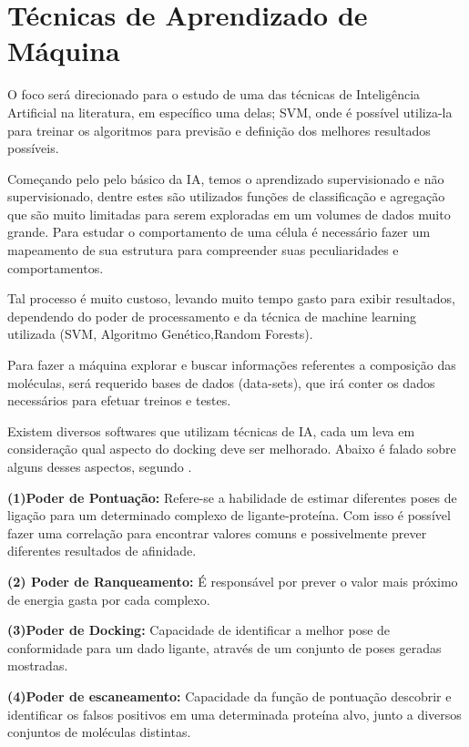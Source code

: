 \documentclass[tcc, capa]{texucpel}
\begin{document}


\section{Técnicas de Aprendizado de Máquina }
O foco será direcionado para o estudo de uma das técnicas de Inteligência Artificial na literatura, em específico uma delas; SVM, onde é possível utiliza-la para treinar os algoritmos para previsão e definição dos melhores resultados possíveis. 

Começando pelo pelo básico da IA, temos o aprendizado supervisionado e não supervisionado, dentre estes são utilizados funções de classificação e agregação que são muito limitadas para serem exploradas em um volumes de dados muito grande.%
Para estudar o comportamento de uma célula é necessário fazer um mapeamento de sua estrutura para compreender suas peculiaridades e comportamentos. 

Tal processo é muito custoso, levando muito tempo gasto para exibir resultados, dependendo do poder de processamento e da técnica de machine learning utilizada (SVM, Algoritmo Genético,Random Forests).

Para fazer a máquina explorar e buscar informações referentes a composição das moléculas, será requerido bases de dados (data-sets), que irá conter os dados necessários para efetuar treinos e testes. 

Existem diversos softwares que utilizam técnicas de IA, cada um leva em consideração qual aspecto do docking deve ser melhorado. Abaixo é falado sobre alguns desses aspectos, segundo \textbf{\cite{khamis2015machine}}.

\textbf{(1)Poder de Pontuação:} Refere-se a habilidade de estimar diferentes poses de ligação para um determinado complexo de ligante-proteína. Com isso é possível fazer uma correlação para encontrar valores comuns e possivelmente prever diferentes resultados de afinidade.

\textbf{(2) Poder de Ranqueamento:}
É responsável por prever o valor mais próximo de energia gasta por cada complexo.

\textbf{(3)Poder de Docking:} Capacidade de identificar a melhor pose de conformidade para um dado ligante, através de um conjunto de poses geradas mostradas.

\textbf{(4)Poder de escaneamento:} Capacidade da função de pontuação descobrir e identificar os falsos positivos em uma determinada proteína alvo, junto a diversos conjuntos de moléculas distintas.
\end{document}
